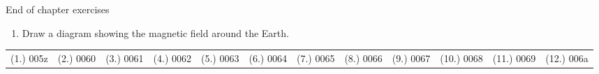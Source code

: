 \begin{eocexercises}{ End of chapter exercises}
\begin{enumerate}[noitemsep, label=\textbf{\arabic*}. ]
\label{m37830*uid39}\item Draw a diagram showing the magnetic field around the Earth.\newline
\end{enumerate}
  \label{m37830**end}
\par \practiceinfo
 \par \begin{tabular}[h]{cccccc}
 (1.) 005z  &  (2.) 0060  &  (3.) 0061  &  (4.) 0062  &  (5.) 0063  &  (6.) 0064  &  (7.) 0065  &  (8.) 0066  &  (9.) 0067  &  (10.) 0068  &  (11.) 0069  &  (12.) 006a  & \end{tabular}
\end{eocexercises}
